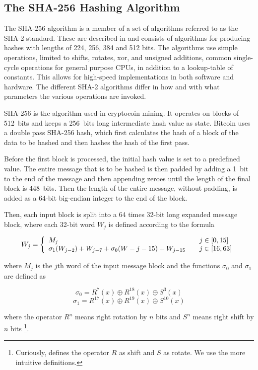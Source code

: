 \subsection{The SHA-256 Hashing Algorithm}
\label{sec:hashing-algo}

The SHA-256 algorithm is a member of a set of algorithms referred to as the SHA-2 standard.
These are described in \cite{fips180-4} and consists of algorithms for producing hashes with lengths of 224, 256, 384 and 512 bits.
The algorithms use simple operations, limited to shifts, rotates, xor, and unsigned additions,
common single-cycle operations for general purpose CPUs, in addition to a lookup-table of constants.
This allows for high-speed implementations in both software and hardware. The different SHA-2 algorithms
differ in how and with what parameters the various operations are invoked.

SHA-256 is the algorithm used in cryptocoin mining. It operates on blocks of 512~bits and keeps
a 256~bits long intermediate hash value as state. Bitcoin uses a double pass SHA-256 hash, which
first calculates the hash of a block of the data to be hashed and then hashes the hash of the first
pass.

Before the first block is processed, the initial hash value is set to a predefined
value. The entire message that is to be hashed is then padded by adding a 1~bit to
the end of the message and then appending zeroes until the length of the final block
is 448̃~bits. Then the length of the entire message, without padding, is added as a
64-bit big-endian integer to the end of the block.

Then, each input block is split into a 64 times 32-bit long expanded message block, where
each 32-bit word $W_j$ is defined according to the formula

\[ W_j = \left\{
	\begin{array}{l l}
		M_j & \quad j \in \left[0, 15\right]\\
		\sigma_1(W_{j - 2}) + W_{j - 7} + \sigma_0(W-{j - 15}) + W_{j - 15} & \quad j \in \left[16, 63\right]
	\end{array}
\right.\]

\noindent where $M_j$ is the $j$th word of the input message block and the functions
$\sigma_0$ and $\sigma_1$ are defined as

\[\sigma_0 = R^7(x) \oplus R^{18}(x) \oplus S^3(x)\]
\[\sigma_1 = R^{17}(x) \oplus R^{19}(x) \oplus S^{10}(x)\]

\noindent where the operator $R^n$ means right rotation by $n$ bits and $S^n$ means right shift by $n$
bits \footnote{Curiously, \cite{sha-spec} defines the operator $R$ as shift and $S$ as rotate.
We use the more intuitive definitions.}.

